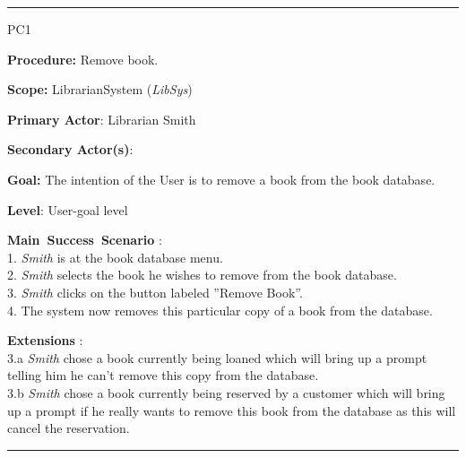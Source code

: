 
\vspace{0.5cm}
\hrule
\begin{lyxlist}{PC1}
\small{
\item [\textbf{Procedure:}] Remove book.
\item [\textbf{Scope:}] LibrarianSystem (\emph{LibSys})
\item [\textbf{Primary Actor}:] Librarian Smith
\item [\textbf{Secondary Actor(s)}:] 
\item [\textbf{Goal:}] The intention of the User is to remove a book from the
book database.
\item [\textbf{Level}:] User-goal level
\item [\textbf{Main~Success~Scenario}]:\\
1. \emph{Smith} is at the book database menu.\\
2. \emph{Smith} selects the book he wishes to remove from the book database.\\
3. \emph{Smith} clicks on the button labeled ''Remove Book''.\\
4. The system now removes this particular copy of a book from the
database.\\


\item [\textbf{Extensions}]:\\
3.a \emph{Smith} chose a book currently being loaned which will bring up a
prompt telling him he can't remove this copy from the database.\\
3.b \emph{Smith} chose a book currently being reserved by a customer which will
bring up a prompt if he really wants to remove this book from the database as
this will cancel the reservation.\\
}

\end{lyxlist}
\hrule


